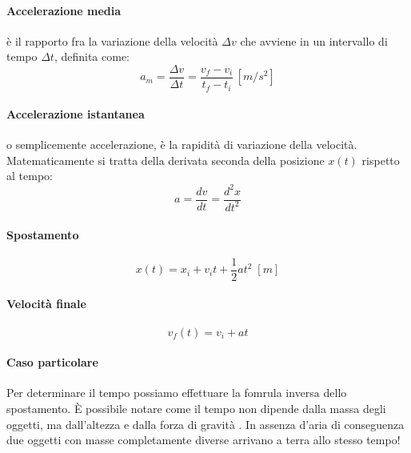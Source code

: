         \paragraph{Accelerazione media} è il rapporto fra la variazione della
        velocità $\Delta v$ che avviene in un intervallo di tempo $\Delta t$, 
        definita come:
        \begin{equation}
            a_m = \frac{\Delta v}{\Delta t} = \frac{v_f - v_i}{t_f - t_i} 
            \, [m/s^2]
        \end{equation}

        \paragraph{Accelerazione istantanea} o semplicemente accelerazione, è 
        la rapidità di variazione della velocità. Matematicamente si tratta 
        della derivata seconda della posizione $x(t)$ rispetto al tempo:
        \begin{equation}
            a = \frac{dv}{dt} = \frac{d^2x}{dt^2}
        \end{equation}

        \paragraph{Spostamento}
            \begin{equation}
                x(t) = x_i + v_it + \frac{1}{2}at^2 \; [m]
            \end{equation}

        \paragraph{Velocità finale}
            \begin{equation}
                v_f(t) = v_{i} + at
            \end{equation}
    
        \paragraph{Caso particolare}
            Per determinare il tempo possiamo effettuare la fomrula inversa 
            dello spostamento. È possibile notare come il tempo non dipende 
            dalla massa degli oggetti, ma dall'altezza e dalla forza di gravità
            . In assenza d'aria di conseguenza due oggetti con masse 
            completamente diverse arrivano a terra allo stesso tempo!

